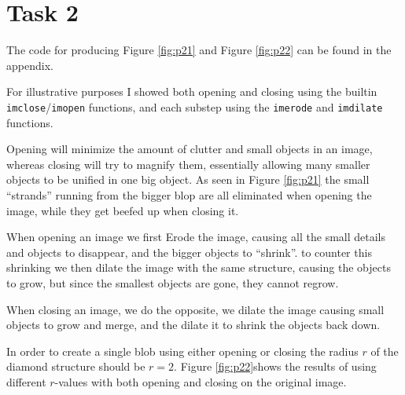 \section{Task 2}
The code for producing Figure \ref{fig:p21} and Figure \ref{fig:p22} can be found in the appendix.


For illustrative purposes I showed both opening and closing using the builtin \texttt{imclose}/\texttt{imopen} functions,
and  each substep using the \texttt{imerode} and \texttt{imdilate} functions.

Opening will minimize the amount of clutter and small objects in an image, whereas closing will try
to magnify them, essentially allowing many smaller objects to be unified in one big object. As seen
in Figure \ref{fig:p21} the small ``strands'' running from the bigger blop are all eliminated when
opening the image, while they get beefed up when closing it.

When opening an image we first Erode the image, causing all the small details and objects to disappear,
and the bigger objects to ``shrink''. to counter this shrinking we then dilate the image with the same
structure, causing the objects to grow, but since the smallest objects are gone, they cannot regrow.

When closing an image, we do the opposite, we dilate the image causing small objects to grow and merge,
and the dilate it to shrink the objects back down.

In order to create a single blob using either opening or closing the radius $r$ of the diamond structure should be $r=2$.
Figure \ref{fig:p22}shows the results of using different $r$-values with both opening and closing on the original image.

